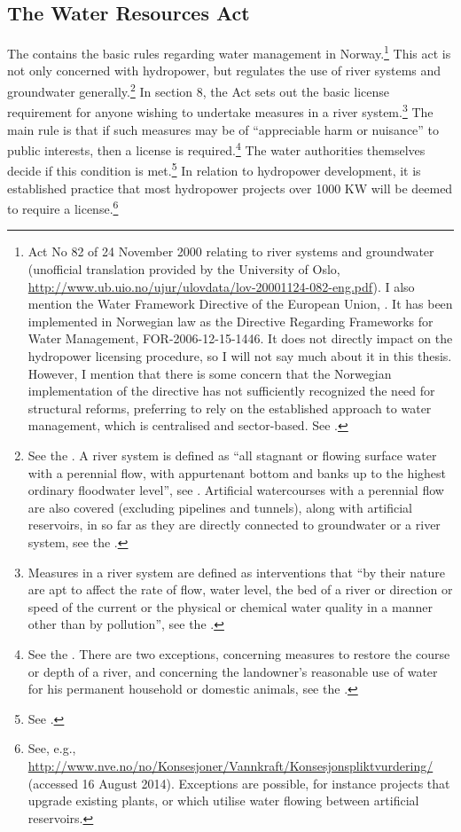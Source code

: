 \subsection{The Water Resources Act}\label{sec:wra00}

The \cite{wra00} contains the basic rules regarding water management in Norway.\footnote{Act No 82 of 24 November 2000 relating to river systems and groundwater (unofficial translation provided by the University of Oslo, \url{http://www.ub.uio.no/ujur/ulovdata/lov-20001124-082-eng.pdf}). I also mention the Water Framework Directive of the European Union, \cite{water00}. It has been implemented in Norwegian law as the Directive Regarding Frameworks for Water Management, FOR-2006-12-15-1446. It does not directly impact on the hydropower licensing procedure, so I will not say much about it in this thesis. However, I mention that there is some concern that the Norwegian implementation of the directive has not sufficiently recognized the need for structural reforms, preferring to rely on the established approach to water management, which is centralised and sector-based. See \cite{hanssen14}.} This act is not only concerned with hydropower, but regulates the use of river systems and groundwater generally.\footnote{See the \cite[1]{wra00}. A river system is defined as ``all stagnant or flowing surface water with a perennial flow, with appurtenant bottom and banks up to the highest ordinary floodwater level'', see \cite[2]{wra00}. Artificial watercourses with a perennial flow are also covered (excluding pipelines and tunnels), along with artificial reservoirs, in so far as they are directly connected to groundwater or a river system, see the \cite[2a-2b]{wra00}.} In section 8, the Act sets out the basic license requirement for anyone wishing to undertake measures in a river system.\footnote{Measures in a river system are defined as interventions that ``by their nature are apt to affect the rate of flow, water level, the bed of a river or direction or speed of the current or the physical or chemical water quality in a manner other than by pollution'', see the \cite[3a]{wra00}.} The main rule is that if such measures may be of ``appreciable harm or nuisance''  to public interests, then a license is required.\footnote{See the \cite[8]{wra00}. There are two exceptions, concerning measures to restore the course or depth of a river, and concerning the landowner's reasonable use of water for his permanent household or domestic animals, see the \cite[12|15]{wra00}.} The water authorities themselves decide if this condition is met.\footnote{See \cite[18]{wra00}.} In relation to hydropower development, it is established practice that most hydropower projects over 1000 KW will be deemed to require a license.\footnote{See, e.g., \url{http://www.nve.no/no/Konsesjoner/Vannkraft/Konsesjonspliktvurdering/} (accessed 16 August 2014). Exceptions are possible, for instance projects that upgrade existing plants, or which utilise water flowing between artificial reservoirs.}

